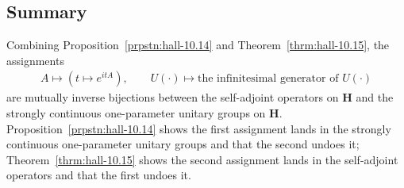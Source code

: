 \subsection{Summary}
Combining Proposition~\ref{prpstn:hall-10.14} and Theorem~\ref{thrm:hall-10.15}, the assignments
\begin{align}
    A \longmapsto \left( t \mapsto e^{itA} \right), \qquad U(\cdot) \longmapsto \text{the infinitesimal generator of } U(\cdot)
\end{align}
are mutually inverse bijections between the self-adjoint operators on $\mathbf{H}$ and the strongly continuous one-parameter unitary groups on $\mathbf{H}$. Proposition~\ref{prpstn:hall-10.14} shows the first assignment lands in the strongly continuous one-parameter unitary groups and that the second undoes it; Theorem~\ref{thrm:hall-10.15} shows the second assignment lands in the self-adjoint operators and that the first undoes it.
